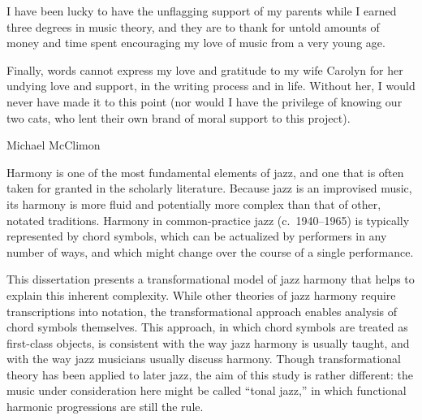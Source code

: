 I have been lucky to have the unflagging support of my parents while I earned
three degrees in music theory, and they are to thank for untold amounts of
money and time spent encouraging my love of music from a very young age.

Finally, words cannot express my love and gratitude to my wife Carolyn for her
undying love and support, in the writing process and in life. Without her, I
would never have made it to this point (nor would I have the privilege of
knowing our two cats, who lent their own brand of moral support to this
project).


\singlespacing

\cleardoublepage


{}
\begin{center}
  Michael McClimon \\
  \vspace{0.5\baselineskip}
  {
    \MakeUppercase{\Title}
  }
\end{center}

\doublespacing

Harmony is one of the most fundamental elements of jazz, and one that is often
taken for granted in the scholarly literature. Because jazz is an improvised
music, its harmony is more fluid and potentially more complex than that of
other, notated traditions. Harmony in common-practice jazz (c.\ 1940--1965) is
typically represented by chord symbols, which can be actualized by performers
in any number of ways, and which might change over the course of a single
performance.

This dissertation presents a transformational model of jazz harmony that helps
to explain this inherent complexity. While other theories of jazz harmony
require transcriptions into notation, the transformational approach enables
analysis of chord symbols themselves. This approach, in which chord symbols
are treated as first-class objects, is consistent with the way jazz harmony is
usually taught, and with the way jazz musicians usually discuss harmony.
Though transformational theory has been applied to later jazz, the aim of this
study is rather different: the music under consideration here might be called
``tonal jazz,'' in which functional harmonic progressions are still the rule.

